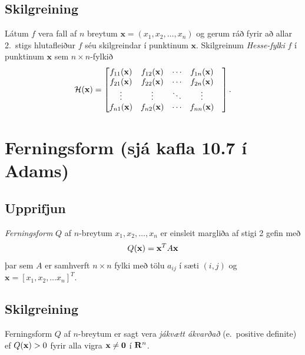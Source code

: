 \documentclass[a4paper,10pt,icelandic]{sphinxmanual}
\begin{document}
\subsection{Skilgreining}
\label{Kafli3:id5}
Látum \(f\) vera fall af \(n\) breytum
\(\mathbf{x} = (x_1,x_2,\ldots,x_n)\) og gerum ráð fyrir að allar
2. stigs hlutafleiður \(f\) séu skilgreindar í punktinum
\(\mathbf{x}\). Skilgreinum \emph{Hesse-fylki} \(f\) í punktinum
\(\mathbf{x}\) sem \(n\times n\)-fylkið
\begin{gather}
\begin{split}{\cal H}(\mathbf{x})=\begin{bmatrix} f_{11}(\mathbf{x})&f_{12}(\mathbf{x}) & \cdots & f_{1n}(\mathbf{x})\\
 f_{21}(\mathbf{x})&f_{22}(\mathbf{x}) & \cdots & f_{2n}(\mathbf{x}) \\
 \vdots & \vdots & \ddots & \vdots & \\
  f_{n1}(\mathbf{x})&f_{n2}(\mathbf{x}) & \cdots & f_{nn}(\mathbf{x})\end{bmatrix}.\end{split}\notag
\end{gather}

\section{Ferningsform (sjá kafla 10.7 í Adams)}
\label{Kafli3:ferningsform-sja-kafla-10-7-i-adams}

\subsection{Upprifjun}
\label{Kafli3:id6}
\emph{Ferningsform} \(Q\) af \(n\)-breytum
\(x_1,x_2,\ldots, x_n\) er einsleit margliða af stigi 2 gefin með
\begin{gather}
\begin{split}Q(\mathbf{x}) = \mathbf{x}^T A \mathbf{x}\end{split}\notag
\end{gather}
þar sem \(A\) er samhverft \(n \times n\) fylki með tölu
\(a_{ij}\) í sæti \((i,j)\) og
\(\mathbf{x} = [x_1,x_2,\ldots x_n]^T\).


\subsection{Skilgreining}
\label{Kafli3:id7}
Ferningsform \(Q\) af \(n\)-breytum er sagt vera \emph{jákvætt
ákvarðað} (e. positive definite) ef \(Q(\mbox{${\bf x}$})>0\) fyrir
alla vigra \(\mbox{${\bf x}$}\neq \mbox{${\bf 0}$}\) í
\(\mbox{${\bf R}^n$}\).
\end{document}
